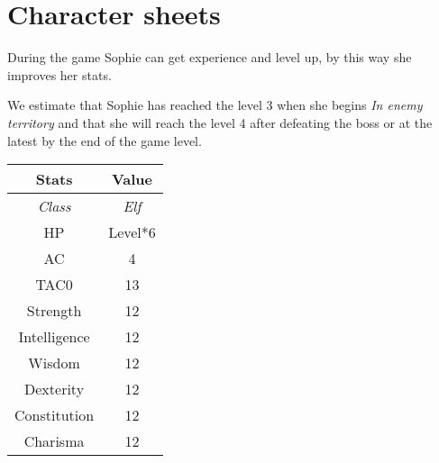 \section{Character sheets}

During the game Sophie can get experience and level up, by this way she improves her stats.

We estimate that Sophie has reached the level 3 when she begins \textit{In enemy territory} and that she will reach the level 4 after defeating the boss or at the latest by the end of the game level.
\begin{table}[H]
  \centering
  \begin{tabular}{|c|c|}
    \hline
    \rowcolor[HTML]{C0C0C0}
    \textbf{Stats} & \textbf{Value} \\ \hline
    \textit{Class} & \textit{Elf} \\ \hline
    HP & Level*6 \\ \hline
    AC & 4 \\ \hline
    TAC0 & 13 \\ \hline
    Strength & 12 \\ \hline
    Intelligence & 12 \\ \hline
    Wisdom & 12  \\ \hline
    Dexterity & 12 \\ \hline
    Constitution & 12  \\ \hline
    Charisma & 12 \\ \hline
  \end{tabular}
\end{table}
